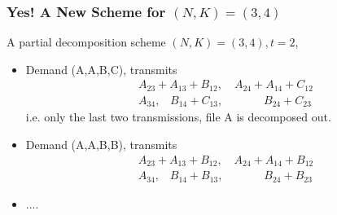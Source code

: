 \documentclass{beamer}
\begin{document}
\begin{frame}
\frametitle{Yes! A New Scheme for $(N,K)=(3,4)$}
A partial decomposition scheme $(N,K)=(3,4), t=2$,

\begin{itemize}
	\item Demand (A,A,B,C), transmits
	\begin{align*}
	& A_{23} +A_{13}+B_{12}, \quad  A_{24} +A_{14}+C_{12} \\
	& A_{34}, \;\;\; B_{14}+C_{13} ,\qquad \quad \;\; B_{24}+C_{23}
	\end{align*}
	i.e. only the last two transmissions, file A is decomposed out.
	\item Demand (A,A,B,B), transmits
	\begin{align*}
	& A_{23} +A_{13}+B_{12}, \quad  A_{24} +A_{14}+B_{12} \\
	& A_{34}, \;\;\; B_{14}+B_{13} ,\qquad \quad \;\; B_{24}+B_{23}
	\end{align*}
	\item ....
\end{itemize}
\end{frame}

\end{document}
